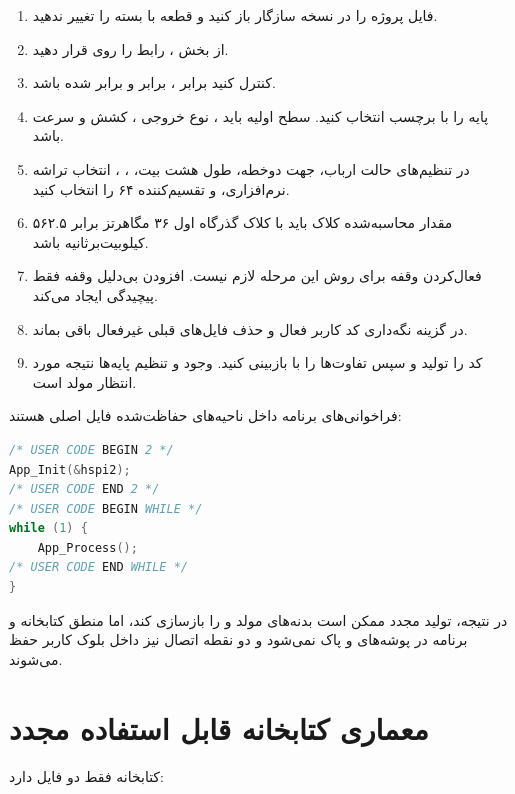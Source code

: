 \begin{enumerate}
  \item فایل پروژه را در نسخه سازگار  باز کنید و قطعه  با بسته  را تغییر ندهید.
  \item از بخش ، رابط  را روی  قرار دهید.
  \item کنترل کنید  برابر ،  برابر  و  برابر  شده باشد.
  \item پایه  را  با برچسب  انتخاب کنید. سطح اولیه باید ، نوع خروجی ، کشش  و سرعت  باشد.
  \item در تنظیم‌های  حالت ارباب، جهت دوخطه، طول هشت بیت، ، ، انتخاب تراشه نرم‌افزاری،  و تقسیم‌کننده ۶۴ را انتخاب کنید.
  \item مقدار محاسبه‌شده کلاک باید با کلاک گذرگاه اول ۳۶ مگاهرتز برابر ۵۶۲.۵ کیلوبیت‌برثانیه باشد.
  \item فعال‌کردن وقفه  برای روش  این مرحله لازم نیست. افزودن بی‌دلیل وقفه فقط پیچیدگی ایجاد می‌کند.
  \item در  گزینه نگه‌داری کد کاربر فعال و حذف فایل‌های قبلی غیرفعال باقی بماند.
  \item کد را تولید و سپس تفاوت‌ها را با  بازبینی کنید. وجود  و تنظیم پایه‌ها نتیجه مورد انتظار مولد است.
\end{enumerate}

فراخوانی‌های برنامه داخل ناحیه‌های حفاظت‌شده فایل اصلی هستند:

\begin{LTR}
\begin{lstlisting}[language=C]
/* USER CODE BEGIN 2 */
App_Init(&hspi2);
/* USER CODE END 2 */
/* USER CODE BEGIN WHILE */
while (1) {
    App_Process();
/* USER CODE END WHILE */
}
\end{lstlisting}
\end{LTR}

در نتیجه، تولید مجدد  ممکن است بدنه‌های مولد
و
را بازسازی کند، اما منطق کتابخانه و برنامه در پوشه‌های
و
پاک نمی‌شود و دو نقطه اتصال نیز داخل بلوک کاربر حفظ می‌شوند.

\section{معماری کتابخانه قابل استفاده مجدد}
کتابخانه فقط دو فایل دارد:

